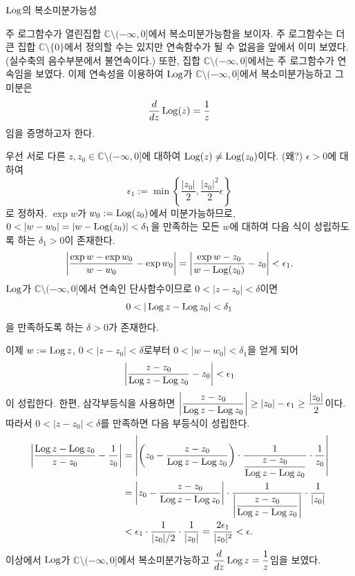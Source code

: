 \begin{saltexample}[label=example-2-9]{$\mathop{\mathrm{Log}}$의 복소미분가능성}{} 

주 로그함수가 열린집합 $\mathbb C \setminus(-\infty,0]$에서
복소미분가능함을 보이자.
주 로그함수는 더 큰 집합 $\mathbb C \setminus\{0\}$에서 정의할 수는 있지만
연속함수가 될 수 없음을 앞에서 이미 보였다.(실수축의 음수부분에서 불연속이다.)
또한, 집합 $\mathbb C \setminus(-\infty,0]$에서는 주 로그함수가 연속임을 보였다.
이제 연속성을 이용하여 $\mathop{\mathrm{Log}}$가 $\mathbb C \setminus(-\infty,0]$에서
복소미분가능하고 그 미분은
\[
\displaystyle\frac{d}{dz} \mathop{\mathrm{Log}} (z) = \displaystyle\frac 1z 
\]
임을 증명하고자 한다.

우선 서로 다른 $z, z_0 \in \mathbb C \setminus(-\infty,0]$에 대하여
$\mathop{\mathrm{Log}} (z) \ne \mathop{\mathrm{Log}}(z_0)$이다. (왜?)
$\epsilon>0$에 대하여
\[
\epsilon_1 := \min \left\{ \dfrac{|z_0|}2, \dfrac{|z_0|^2}2\epsilon \right\}
\]
로 정하자.
$\exp w$가 $w_0:=\mathop{\mathrm{Log}}(z_0)$에서 미분가능하므로,
$0<|w-w_0| = |w - \Log(z_0)| < \delta_1$을 만족하는 모든 $w$에 대하여
다음 식이 성립하도록 하는 $\delta_1>0$이 존재한다.
\[
\left| \displaystyle\frac{\exp w - \exp w_0}{w-w_0} - \exp w_0 \right|
= \left| \displaystyle\frac{\exp w - z_0}{w - \mathop{\mathrm{Log}}(z_0)} - z_0 \right| <\epsilon_1.
\]
$\mathop{\mathrm{Log}}$가 $\mathbb C \setminus(-\infty,0]$에서
연속인 단사함수이므로
$0<|z-z_0|<\delta$이면 
\[
0 < |\mathop{\mathrm{Log}} z - \mathop{\mathrm{Log}} z_0 | < \delta_1
\]
을 만족하도록 하는 $\delta>0$가 존재한다.

이제 $w:=\mathop{\mathrm{Log}} z$, $0<|z-z_0|<\delta$로부터
$0<|w-w_0|<\delta_1$을 얻게 되어
\[
\left| \displaystyle\frac{z-z_0}{\mathop{\mathrm{Log}} z - \mathop{\mathrm{Log}} z_0} - z_0 \right| < \epsilon_1
\]
이 성립한다.
한편, 삼각부등식을 사용하면
$ \left| \displaystyle\frac{z-z_0}{\mathop{\mathrm{Log}} z - \mathop{\mathrm{Log}} z_0} \right| \ge |z_0| - \epsilon_1 
\ge \displaystyle\frac{|z_0|}2$이다.
따라서 
$0<|z-z_0|<\delta$를 만족하면 다음 부등식이 성립한다.
\begin{align*}
\left| \displaystyle\frac{\mathop{\mathrm{Log}} z - \mathop{\mathrm{Log}} z_0}{z-z_0} - \displaystyle\frac1{z_0} \right|
&= \left| \left(z_0 - \displaystyle\frac{z-z_0}{\mathop{\mathrm{Log}} z - \mathop{\mathrm{Log}} z_0} \right)\cdot
\displaystyle\frac1{\displaystyle\frac{z-z_0}{\mathop{\mathrm{Log}} z - \mathop{\mathrm{Log}} z_0}}\cdot \displaystyle\frac1{z_0} \right| \\
&= \left| z_0 - \displaystyle\frac{z-z_0}{\mathop{\mathrm{Log}} z - \mathop{\mathrm{Log}} z_0} \right| \cdot
\displaystyle\frac1{\left|\displaystyle\frac{z-z_0}{\mathop{\mathrm{Log}} z - \mathop{\mathrm{Log}} z_0}\right|} \cdot
\displaystyle\frac1{|z_0|} \\
&< \epsilon_1 \cdot \displaystyle\frac1{|z_0|/2}\cdot \displaystyle\frac1{|z_0|} 
= \displaystyle\frac{2\epsilon_1}{|z_0|^2} < \epsilon.
\end{align*}
이상에서 $\mathop{\mathrm{Log}}$가 $\mathbb C \setminus (-\infty,0]$에서 복소미분가능하고
$\displaystyle\frac{d}{dz}\mathop{\mathrm{Log}} z = \displaystyle\frac 1z$임을 보였다.
\end{saltexample}

